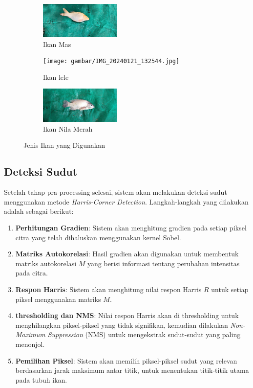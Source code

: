 \begin{figure}
	\centering
	\begin{subfigure}{.3\textwidth}
		\centering
        \includegraphics [keepaspectratio, width=4cm]{gambar/IMG_20240121_131125.jpg}
		\caption{Ikan Mas}
	\end{subfigure}
	\begin{subfigure}{.3\textwidth}
		\centering
		\texttt{[image: gambar/IMG\_20240121\_132544.jpg]}
		\caption{Ikan lele}
	\end{subfigure} 
	\begin{subfigure}{.3\textwidth}
		\centering
		\includegraphics [keepaspectratio, width=4cm]{gambar/IMG_20240121_140044.jpg}
		\caption{Ikan Nila Merah}
	\end{subfigure}
	\caption{Jenis Ikan yang Digunakan}
    \label{fig:dataset}
\end{figure}


\subsection{Deteksi Sudut}
    Setelah tahap pra-processing selesai, sistem akan melakukan deteksi sudut menggunakan metode \emph{Harris-Corner Detection}. Langkah-langkah yang dilakukan adalah sebagai berikut: 
    \begin{enumerate}
            \item \textbf{Perhitungan Gradien}: Sistem akan menghitung gradien pada setiap piksel citra yang telah dihaluskan menggunakan kernel Sobel.
            \item \textbf{Matriks Autokorelasi}: Hasil gradien akan digunakan untuk membentuk matriks autokorelasi \(M\) yang berisi informasi tentang perubahan intensitas pada citra.
            \item \textbf{Respon Harris}: Sistem akan menghitung nilai respon Harris \(R\) untuk setiap piksel menggunakan matriks \(M\).
            \item \textbf{thresholding dan NMS}: Nilai respon Harris akan di thresholding untuk menghilangkan piksel-piksel yang tidak signifikan, kemudian dilakukan \emph{Non-Maximum Suppression} (NMS) untuk mengekstrak sudut-sudut yang paling menonjol.
            \item \textbf{Pemilihan Piksel}: Sistem akan memilih piksel-piksel sudut yang relevan berdasarkan jarak maksimum antar titik, untuk menentukan titik-titik utama pada tubuh ikan.
        \end{enumerate}

